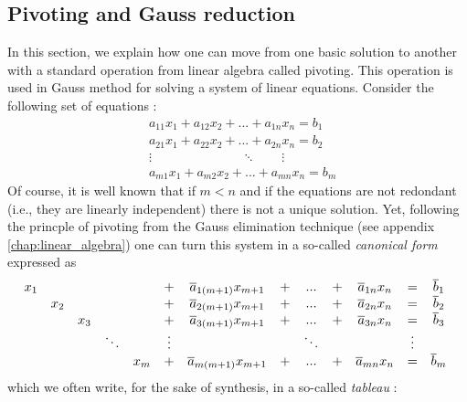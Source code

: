 \subsection{Pivoting and Gauss reduction}

In this section, we explain how one can move from one basic solution to another with a standard operation from linear algebra called pivoting. This operation is used in Gauss method for solving a system of linear equations. Consider the following set of equations :
\begin{align*}
&a_{11}x_1 + a_{12}x_2 + ... + a_{1n}x_n = b_1 \\
&a_{21}x_1 + a_{22}x_2 + ... + a_{2n}x_n = b_2 \\
&\vdots \qquad\qquad\qquad\quad\ddots\qquad \vdots \\
&a_{m1}x_1 + a_{m2}x_2 + ... + a_{mn}x_n = b_m
\end{align*}
Of course, it is well known that if $m < n$ and if the equations are not redondant (i.e., they are linearly independent) there is not a unique solution. Yet, following the princple of pivoting from the Gauss elimination technique (see appendix \ref{chap:linear_algebra}) one can turn this system in a so-called \textit{canonical form} expressed as 
\begin{equation*}
    \resizebox{\linewidth}{!}{$
    \begin{array}{ccccccccccccc}
        x_1 & & & & & + & \overline a_{1(m+1)}x_{m+1} & + & ... & + & \overline a_{1n}x_n & = & \overline b_1 \\
        & x_2 & & & & + & \overline a_{2(m+1)}x_{m+1} & + & ... & + & \overline a_{2n}x_n & = & \overline b_2 \\
        & & x_3 & & & + & \overline a_{3(m+1)}x_{m+1} & + & ... & + & \overline a_{3n}x_n & = & \overline b_3 \\
        & & & \ddots & & \vdots & & & \ddots  & & & \vdots\\
        & & & & x_m & + & \overline a_{m(m+1)}x_{m+1} & + & ... & + & \overline a_{mn}x_n & = & \overline b_m \\
    \end{array}
    $
    }
\end{equation*}
which we often write, for the sake of synthesis, in a so-called \textit{tableau} :
